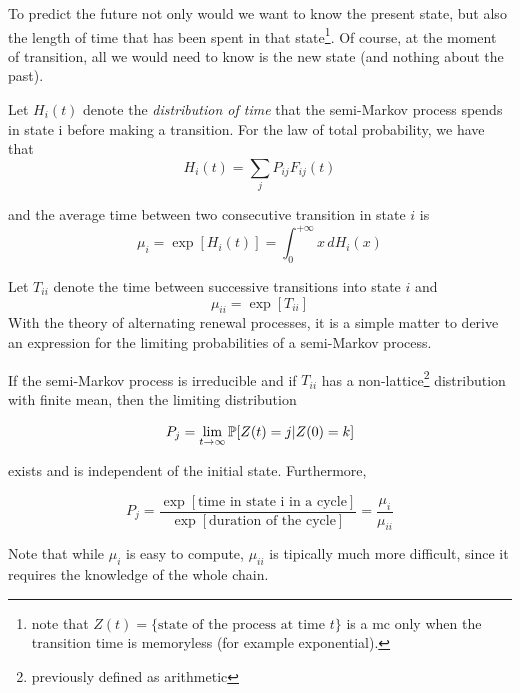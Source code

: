 To predict the future not only would we want to know the present state, but also the length of time that has been spent in that state\footnote{note that $Z(t) = \{\text{state of the process at time } t\}$ is a \gls{mc} only when the transition time is memoryless (for example exponential).}. Of course, at the moment of transition, all we would need to know is the new state (and nothing about the past).

Let $H_i(t)$ denote the \emph{distribution of time} that the semi-Markov process spends in state i before making a transition. For the law of total probability, we have that
\begin{equation}
	H_i(t) = \sum_j P_{ij} F_{ij}(t)
\end{equation}

and the average time between two consecutive transition in state $i$ is
\begin{equation}
	 \mu_i = \exp[H_i(t)] = \int_{0}^{+\infty}x \,dH_i(x)
\end{equation}

Let $T_{ii}$ denote the time between successive transitions into state $i$ and
\begin{equation}
\mu_{ii}=\exp [T_{ii}]
\end{equation}
With the theory of alternating renewal processes, it is a simple matter to derive an expression for the limiting probabilities of a semi-Markov process.

\begin{theorem}
	If the semi-Markov process is irreducible and if $T_{ii}$ has a non-lattice\footnote{previously defined as arithmetic} distribution with finite mean, then the limiting distribution

	$$P_j = \lim_{t \to \infty} \mathbb{P}[Z(t)=j | Z(0)=k]$$

	exists and is independent of the initial state. Furthermore,

	$$P_j = \frac{\exp[\mbox{time in state i in a cycle}]}{\exp[\mbox{duration of the cycle}]} = \frac{\mu_i}{\mu_{ii}}$$

\end{theorem}
Note that while $\mu_i$ is easy to compute, $\mu_{ii}$ is tipically much more difficult, since it requires the knowledge of the whole chain.

